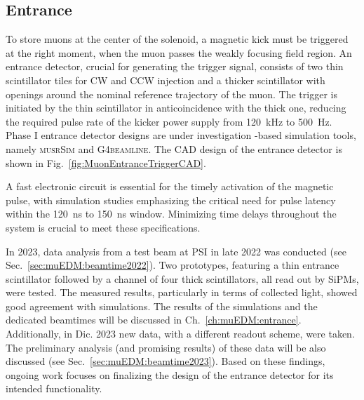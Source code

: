 \begin{refsection}
    \subsection{Entrance}
        To store muons at the center of the solenoid, a magnetic kick must be triggered at the right moment, when the muon passes the weakly focusing field region. 
        An entrance detector, crucial for generating the trigger signal, consists of two thin scintillator tiles for CW and CCW injection and a thicker scintillator with openings around the nominal reference trajectory of the muon. 
        The trigger is initiated by the thin scintillator in anticoincidence with the thick one, reducing the required pulse rate of the kicker power supply from \SI{120}{kHz} to \SI{500}{Hz}. 
        Phase I entrance detector designs are under investigation \gf-based simulation tools, namely \textsc{musrSim} and \textsc{G4beamline}. 
        The CAD design of the entrance detector is shown in Fig.~\ref{fig:MuonEntranceTriggerCAD}.

        \noindent
        A fast electronic circuit is essential for the timely activation of the magnetic pulse, with simulation studies emphasizing the critical need for pulse latency within the \SI{120}{ns} to \SI{150}{ns} window. 
        Minimizing time delays throughout the system is crucial to meet these specifications.

        \noindent
        In 2023, data analysis from a test beam at PSI in late 2022 was conducted (see Sec.~\ref{sec:muEDM:beamtime2022}). 
        Two prototypes, featuring a thin entrance scintillator followed by a channel of four thick scintillators, all read out by SiPMs, were tested. 
        The measured results, particularly in terms of collected light, showed good agreement with simulations.
        The results of the simulations and the dedicated beamtimes will be discussed in Ch.~\ref{ch:muEDM:entrance}.
        Additionally, in Dic. 2023 new data, with a different readout scheme, were taken. 
        The preliminary analysis (and promising results) of these data will be also discussed (see Sec.~\ref{sec:muEDM:beamtime2023}).
        Based on these findings, ongoing work focuses on finalizing the design of the entrance detector for its intended functionality.


\end{refsection}

